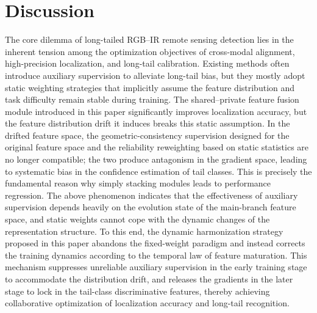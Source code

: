 \documentclass[letterpaper,journal]{IEEEtran}
\begin{document}
\section{Discussion}
The core dilemma of long-tailed RGB--IR remote sensing detection lies in the inherent tension among the optimization objectives of cross-modal alignment, high-precision localization, and long-tail calibration. Existing methods often introduce auxiliary supervision to alleviate long-tail bias, but they mostly adopt static weighting strategies that implicitly assume the feature distribution and task difficulty remain stable during training. The shared--private feature fusion module introduced in this paper significantly improves localization accuracy, but the feature distribution drift it induces breaks this static assumption. In the drifted feature space, the geometric-consistency supervision designed for the original feature space and the reliability reweighting based on static statistics are no longer compatible; the two produce antagonism in the gradient space, leading to systematic bias in the confidence estimation of tail classes. This is precisely the fundamental reason why simply stacking modules leads to performance regression. The above phenomenon indicates that the effectiveness of auxiliary supervision depends heavily on the evolution state of the main-branch feature space, and static weights cannot cope with the dynamic changes of the representation structure. To this end, the dynamic harmonization strategy proposed in this paper abandons the fixed-weight paradigm and instead corrects the training dynamics according to the temporal law of feature maturation. This mechanism suppresses unreliable auxiliary supervision in the early training stage to accommodate the distribution drift, and releases the gradients in the later stage to lock in the tail-class discriminative features, thereby achieving collaborative optimization of localization accuracy and long-tail recognition.
\end{document}
